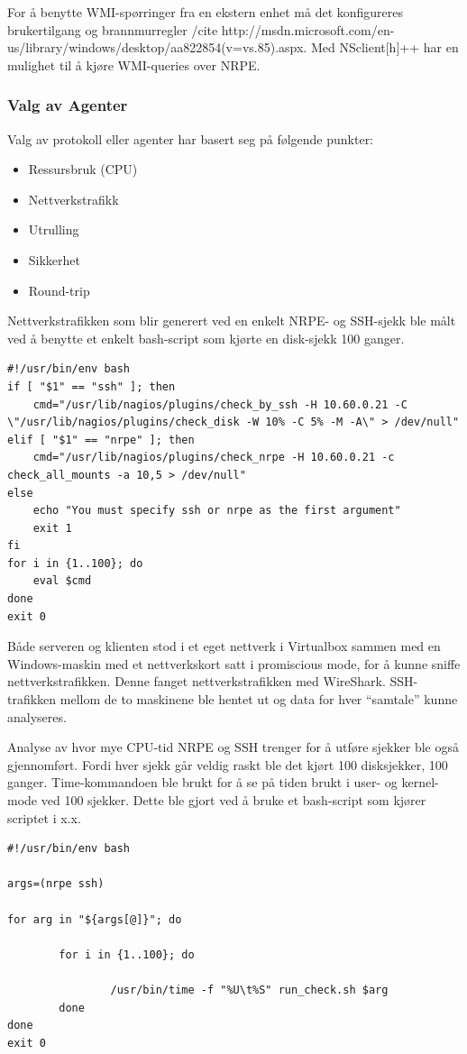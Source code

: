 For å benytte WMI-spørringer fra en ekstern enhet må det konfigureres brukertilgang og brannmurregler /cite http://msdn.microsoft.com/en-us/library/windows/desktop/aa822854(v=vs.85).aspx. Med NSclient[h]++ har en mulighet til å kjøre WMI-queries over NRPE.

\subsubsection{Valg av Agenter}
Valg av protokoll eller agenter har basert seg på følgende punkter:
\begin{itemize}
	\item Ressursbruk (CPU)
	\item Nettverkstrafikk
	\item Utrulling
	\item Sikkerhet
	\item Round-trip
\end{itemize}
Nettverkstrafikken som blir generert ved en enkelt NRPE- og SSH-sjekk ble målt ved å benytte et enkelt bash-script som kjørte en disk-sjekk 100 ganger. 

\begin{lstlisting}
#!/usr/bin/env bash
if [ "$1" == "ssh" ]; then
    cmd="/usr/lib/nagios/plugins/check_by_ssh -H 10.60.0.21 -C \"/usr/lib/nagios/plugins/check_disk -W 10% -C 5% -M -A\" > /dev/null"
elif [ "$1" == "nrpe" ]; then
    cmd="/usr/lib/nagios/plugins/check_nrpe -H 10.60.0.21 -c check_all_mounts -a 10,5 > /dev/null"
else
    echo "You must specify ssh or nrpe as the first argument"
    exit 1
fi
for i in {1..100}; do
    eval $cmd
done
exit 0
\end{lstlisting}

Både serveren og klienten stod i et eget nettverk i Virtualbox sammen med en Windows-maskin med et nettverkskort satt i promiscious mode, for å kunne sniffe nettverkstrafikken. Denne fanget nettverkstrafikken med WireShark. SSH-trafikken mellom de to maskinene ble hentet ut og data for hver “samtale” kunne analyseres.  

Analyse av hvor mye CPU-tid NRPE og SSH trenger for å utføre sjekker ble også gjennomført. Fordi hver sjekk går veldig raskt ble det kjørt 100 disksjekker, 100 ganger. Time-kommandoen ble brukt for å se på tiden brukt i user- og kernel-mode ved 100 sjekker. Dette ble gjort ved å bruke et bash-script som kjører scriptet i x.x.

\begin{lstlisting}
#!/usr/bin/env bash

args=(nrpe ssh)

for arg in "${args[@]}"; do

        for i in {1..100}; do

                /usr/bin/time -f "%U\t%S" run_check.sh $arg
        done
done
exit 0
\end{lstlisting}

